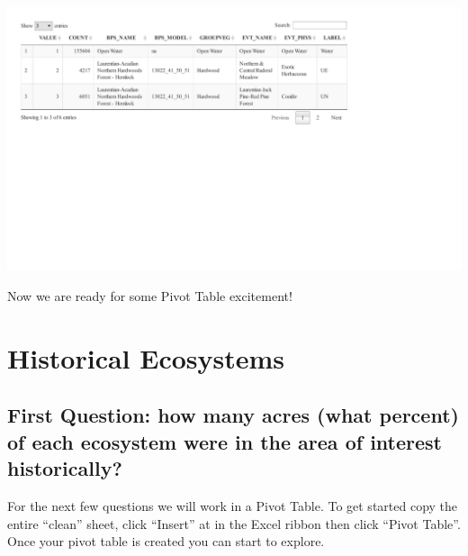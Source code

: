 \documentclass[
]{book}
\begin{document}
\includegraphics{FSCBook_files/figure-latex/combineCleanDT-1.pdf}

Now we are ready for some Pivot Table excitement!

\hypertarget{historicalEcosystems}{%
\chapter{Historical Ecosystems}\label{historicalEcosystems}}

\hypertarget{first-question-how-many-acres-what-percent-of-each-ecosystem-were-in-the-area-of-interest-historically}{%
\section{First Question: how many acres (what percent) of each ecosystem were in the area of interest historically?}\label{first-question-how-many-acres-what-percent-of-each-ecosystem-were-in-the-area-of-interest-historically}}

For the next few questions we will work in a Pivot Table. To get started copy the entire ``clean'' sheet, click ``Insert'' at in the Excel ribbon then click ``Pivot Table''. Once your pivot table is created you can start to explore.
\end{document}
